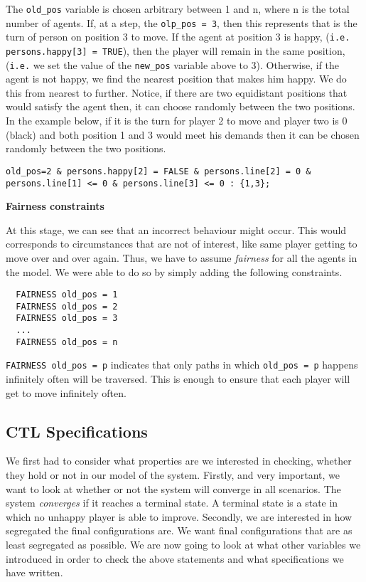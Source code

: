 \documentclass[../main.tex]{subfiles}
\begin{document}
The \verb|old_pos| variable is chosen arbitrary between 1 and n, where n is the total number of agents. If, at a step, the \verb|olp_pos = 3|, then this represents that is the turn of person on position 3 to move. If the agent at position 3 is happy, (\verb|i.e. persons.happy[3] = TRUE|), then the player will remain in the same position, (\verb|i.e.| we set the value of the \verb|new_pos| variable above to 3). Otherwise, if the agent is not happy, we find the nearest position that makes him happy. We do this from nearest to further. Notice, if there are two equidistant positions that would satisfy the agent then, it can choose randomly between the two positions. In the example below, if it is the turn for player 2 to move and player two is 0 (black) and both position 1 and 3 would meet his demands then it can be chosen randomly between the two positions.

\begin{lstlisting}
old_pos=2 & persons.happy[2] = FALSE & persons.line[2] = 0 & persons.line[1] <= 0 & persons.line[3] <= 0 : {1,3};
\end{lstlisting}

\textbf{Fairness constraints}

At this stage, we can see that an incorrect behaviour might occur. This would corresponds to circumstances that are not of interest, like same player getting to move over and over again. Thus, we have to assume \textit{fairness} for all the agents in the model. We were able to do so by simply adding the following constraints.

\begin{lstlisting}
  FAIRNESS old_pos = 1
  FAIRNESS old_pos = 2
  FAIRNESS old_pos = 3
  ...
  FAIRNESS old_pos = n
\end{lstlisting}

\verb|FAIRNESS old_pos = p| indicates that only paths in which \verb|old_pos = p| happens infinitely often will be traversed. This is enough to ensure that each player will get to move infinitely often. \\


\subsection{CTL Specifications}
We first had to consider what properties are we interested in checking, whether they hold or not in our model of the system. Firstly, and very important, we want to look at whether or not the system will converge in all scenarios. The system \textit{converges} if it reaches a terminal state. A terminal state is a state in which no unhappy player is able to improve. Secondly, we are interested in how segregated the final configurations are. We want final configurations that are as least segregated as possible. We are now going to look at what other variables we introduced in order to check the above statements and what specifications we have written.\\
\end{document}

